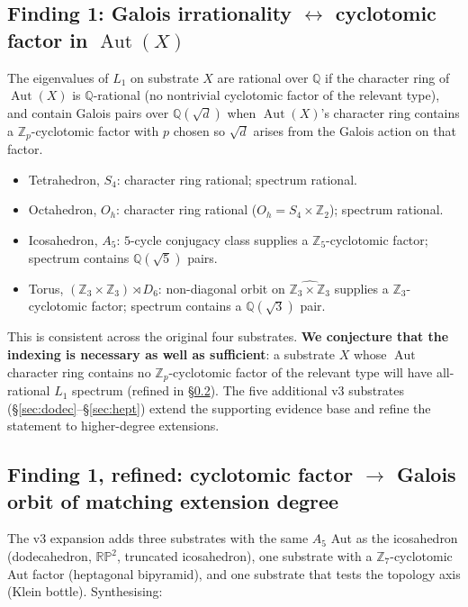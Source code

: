 \documentclass[12pt,a4paper]{article}
\theoremstyle{definition}
\theoremstyle{remark}
\newcommand{\bZ}{\mathbb{Z}}
\newcommand{\bQ}{\mathbb{Q}}                %
\DeclareMathOperator{\Aut}{Aut}
\begin{document}
\subsection{Finding 1: Galois irrationality $\leftrightarrow$ cyclotomic
factor in $\Aut(X)$}\label{sec:dh-cs-galois}

The eigenvalues of $L_1$ on substrate $X$ are rational over $\bQ$ if the
character ring of $\Aut(X)$ is $\bQ$-rational (no nontrivial cyclotomic
factor of the relevant type), and contain Galois pairs over
$\bQ(\sqrt d)$ when $\Aut(X)$'s character ring contains a $\bZ_p$-cyclotomic
factor with $p$ chosen so $\sqrt d$ arises from the Galois action on
that factor.

\begin{itemize}\setlength{\itemsep}{2pt}
\item Tetrahedron, $S_4$: character ring rational; spectrum rational.
\item Octahedron, $O_h$: character ring rational ($O_h = S_4 \times \bZ_2$);
  spectrum rational.
\item Icosahedron, $A_5$: $5$-cycle conjugacy class supplies a
  $\bZ_5$-cyclotomic factor; spectrum contains $\bQ(\sqrt 5)$ pairs.
\item Torus, $(\bZ_3 \times \bZ_3) \rtimes D_6$: non-diagonal orbit on
  $\widehat{\bZ_3 \times \bZ_3}$ supplies a $\bZ_3$-cyclotomic factor;
  spectrum contains a $\bQ(\sqrt 3)$ pair.
\end{itemize}

This is consistent across the original four substrates. \textbf{We
conjecture that the indexing is necessary as well as sufficient}: a
substrate $X$ whose $\Aut$ character ring contains no
$\bZ_p$-cyclotomic factor of the relevant type will have all-rational
$L_1$ spectrum (refined in \S\ref{sec:dh-cs-galois-refined}). The five additional v3
substrates (\S\ref{sec:dodec}--\S\ref{sec:hept}) extend the supporting
evidence base and refine the statement to higher-degree extensions.

\subsection{Finding 1, refined: cyclotomic factor $\to$ Galois orbit
of matching extension degree}\label{sec:dh-cs-galois-refined}

The v3 expansion adds three substrates with the same $A_5$ Aut as the
icosahedron (dodecahedron, $\mathbb{RP}^2$, truncated icosahedron),
one substrate with a $\bZ_7$-cyclotomic Aut factor (heptagonal
bipyramid), and one substrate that tests the topology axis (Klein
bottle). Synthesising:
\end{document}
